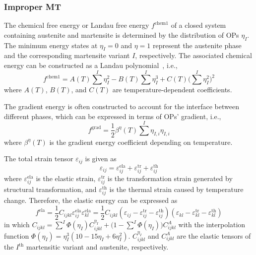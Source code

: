 \documentclass[reprint,3p,sort&compress,times,onecolumn]{elsarticle}
\begin{document}
\subsubsection{Improper MT}
The chemical free energy or Landau free energy $f^{\text{chem1}}$ of a closed system containing austenite and martensite is determined by the distribution of OPs $\eta_I$.
The minimum energy states at $\eta_I = 0$ and $\eta = 1$ represent the austenite phase and the corresponding martensite variant $I$, respectively.
The associated chemical energy can be constructed as a Landau polynomial~\cite{ohmer2022phase}, i.e.,
\begin{equation}
f^{\text{chem1}}=A(T) \sum^I\eta_I^2-B(T)\sum^I\eta_I^3+C(T) \Big(\sum^I\eta_I^2 \Big)^2
\end{equation}
where $A(T)$, $B(T)$, and $C(T)$ are temperature-dependent coefficients.


The gradient energy is often constructed to account for the interface between different phases, which can be expressed in terms of OPs' gradient, i.e.,
\begin{equation}
f^{\text{grad}} = \frac{1}{2}\beta^{\eta}(T)\sum^I \eta_{I,i} \eta_{I,i}
\end{equation}
where $\beta^{\eta}(T)$ is the gradient energy coefficient depending on temperature.

The total strain tensor $\varepsilon_{ij}$ is given as
\begin{equation}
\varepsilon_{ij}=\varepsilon_{ij}^{\text{ela}}+\varepsilon_{ij}^{\text{tr}} + \varepsilon_{ij}^{\text{th}}
\end{equation} 
where $\varepsilon_{ij}^{\text{ela}}$ is the elastic strain, $\varepsilon_{ij}^{\text{tr}}$ is the transformation strain generated by structural transformation, and $\varepsilon_{ij}^{\text{th}}$ is the thermal strain caused by temperature change. Therefore, the elastic energy can be expressed as
\begin{equation}
f^\text{ela} =\frac{1}{2} C_{ijkl}\varepsilon_{ij}^{\text{ela}}\varepsilon_{kl}^{\text{ela}}= \frac{1}{2} C_{ijkl} (\varepsilon_{ij} - \varepsilon_{ij}^{\text{tr}}-\varepsilon_{ij}^{\text{th}}) (\varepsilon_{kl} - \varepsilon_{kl}^{\text{tr}}-\varepsilon_{kl}^{\text{th}}) 
\end{equation}
in which $C_{ijkl}=\sum^I \Phi(\eta_I) C_{ijkl}^{\eta_I}+\big(1-\sum^I\Phi(\eta_I)\big)C_{ijkl}^A$ with the interpolation function $\Phi(\eta_I)=\eta_I^3(10-15\eta_I+6\eta_I^2)$.
$C_{ijkl}^{\eta_I}$ and $C_{ijkl}^A$ are the elastic tensors of the $I^{\text{th}}$ martensitic variant and austenite, respectively.
\end{document}
